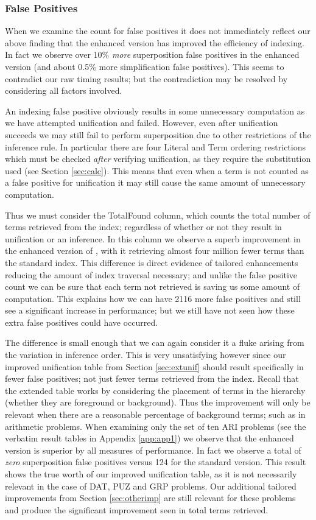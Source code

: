 \subsubsection{False Positives}
When we examine the count for false positives it does not immediately reflect our
above finding that the enhanced version has improved the efficiency of indexing.
In fact we observe over 10\% \emph{more} superposition false positives in the enhanced
version (and about 0.5\% more simplification false positives). This seems to contradict
our raw timing results; but the contradiction may be resolved by considering all factors involved.

An indexing false positive obviously results in some unnecessary computation as we
have attempted unification and failed. However, even after unification succeeds we may
still fail to perform superposition due to other restrictions of the inference rule.
In particular there are four Literal and Term ordering restrictions which must
be checked \emph{after} verifying unification, as they require the substitution
used (see Section \ref{sec:calc}). This means that even when a term
is not counted as a false positive for unification it may still cause the same
amount of unnecessary computation.

Thus we must consider the TotalFound column, which counts the total number of terms
retrieved from the index; regardless of whether or not they result in unification or an inference.
In this column we observe a superb improvement in the enhanced version
of \beagle, with it retrieving almost four million fewer terms than the standard index.
This difference is direct evidence of tailored enhancements reducing the amount of index traversal necessary;
and unlike the false positive count we can be sure that each term not retrieved
is saving us some amount of computation. This explains how we can have 2116 more
false positives and still see a significant increase in performance; but we still
have not seen how these extra false positives could have occurred.

The difference is small enough that we can again consider it a fluke arising from
the variation in inference order. This is very unsatisfying however since our
improved unification table from Section \ref{sec:extunif} should result specifically
in fewer false positives; not just fewer terms retrieved from the index. 
Recall that the extended table works by considering the placement of terms
in the hierarchy (whether they are foreground or background). Thus the improvement will only
be relevant when there are a reasonable percentage of background terms; such as in
arithmetic problems.
When examining only the set of ten ARI problems 
(see the verbatim result tables in Appendix \ref{app:app1}) we observe
that the enhanced version is superior by all measures of performance.
In fact we observe a total of \emph{zero}
superposition false positives versus 124 for the standard version. This result shows the true worth of our
improved unification table, as it is not necessarily relevant in the case of DAT, PUZ
and GRP problems. Our additional tailored improvements from Section \ref{sec:otherimp}
are still relevant for these problems and produce the significant improvement
seen in total terms retrieved.

